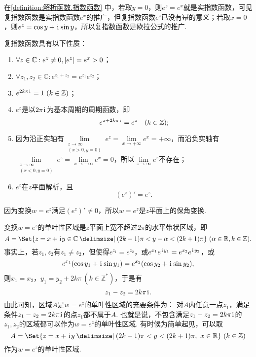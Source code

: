 在\cref{definition:解析函数.指数函数} 中，若取\(y = 0\)，则\(e^z = e^x\)就是实指数函数，可见复指数函数是实指数函数\(e^x\)的推广，但复指数函数\(e^z\)已没有幂的意义；若取\(x = 0\)，则\(e^z = \cos y + \kern1pt\mathrm{i}\kern1pt \sin y\)，所以复指数函数是欧拉公式的推广.

\begin{property}
复指数函数具有以下性质：
\begin{enumerate}
\item \(\forall z\in\mathbb{C} : e^z \neq 0, \abs{e^z} = e^x > 0\)；
\item \(\forall z_1,z_2\in\mathbb{C} : e^{z_1+z_2} = e^{z_1}e^{z_2}\)；
\item \(e^{2k\pi\iu} = 1\ (k\in\mathbb{Z})\)；
\item \(e^z\)是以\(2\pi\kern1pt\mathrm{i}\kern1pt\)为基本周期的周期函数，即\[
e^{z + 2k\pi\kern1pt\mathrm{i}\kern1pt} = e^z \quad (k\in\mathbb{Z});
\]
\item 因为沿正实轴有\(\lim\limits_{\substack{z\to\infty \\ (x>0,y=0)}} e^z = \lim\limits_{x\to+\infty} e^x = +\infty\)，而沿负实轴有\(\lim\limits_{\substack{z\to\infty \\ (x<0,y=0)}} e^z = \lim\limits_{x\to-\infty} e^x = 0\)，所以\(\lim\limits_{z\to\infty} e^z\)不存在；
\item \(e^z\)在\(z\)平面解析，且\begin{equation}\label{equation:解析函数.指数函数的导数}
(e^z)'=e^z.
\end{equation}
\end{enumerate}
\end{property}

因为变换\(w=e^z\)满足\((e^z)' \neq 0\)，所以\(w=e^z\)是\(z\)平面上的保角变换.

变换\(w=e^z\)的单叶性区域是\(z\)平面上宽不超过\(2\pi\)的水平带状区域，即\[
A = \Set{ z=x+\iu y \in \mathbb{C} \given (2k-1)\pi < y-\alpha < (2k+1)\pi }\ (\alpha\in\mathbb{R}, k\in\mathbb{Z}).
\]事实上，若\(z_1,z_2\)有\(z_1 \neq z_2\)，但使得\(e^{z_1} = e^{z_2}\)，或\(e^{x_1}e^{\kern1pt\mathrm{i}\kern1pt y_1} = e^{x_2}e^{\kern1pt\mathrm{i}\kern1pt y_2}\)，或\[
e^{x_1}(\cos y_1 + \kern1pt\mathrm{i}\kern1pt \sin y_1) = e^{x_2}(\cos y_2 + \kern1pt\mathrm{i}\kern1pt \sin y_2),
\]则\(x_1 = x_2\)，\(y_1 = y_2 + 2k\pi\ (k\in\mathbb{Z}^*)\)，于是有\[
z_1 - z_2 = 2k\pi\kern1pt\mathrm{i}\kern1pt.
\]由此可知，区域\(A\)是\(w = e^z\)的单叶性区域的充要条件为：
对\(A\)内任意一点\(z_1\)，满足条件\(z_1 - z_2 = 2k\pi\kern1pt\mathrm{i}\kern1pt\)的点\(z_1\)都不属于\(A\).
也就是说，不包含满足\(z_1 - z_2 = 2k\pi\kern1pt\mathrm{i}\kern1pt\)的\(z_1,z_2\)的区域都可以作为\(w = e^z\)的单叶性区域.
有时候为简单起见，可以取\[
A = \Set{ z=x+\iu y \given (2k-1)\pi < y < (2k+1)\pi,\ x \in \mathbb{R} }\ (k\in\mathbb{Z})
\]作为\(w = e^z\)的单叶性区域.

